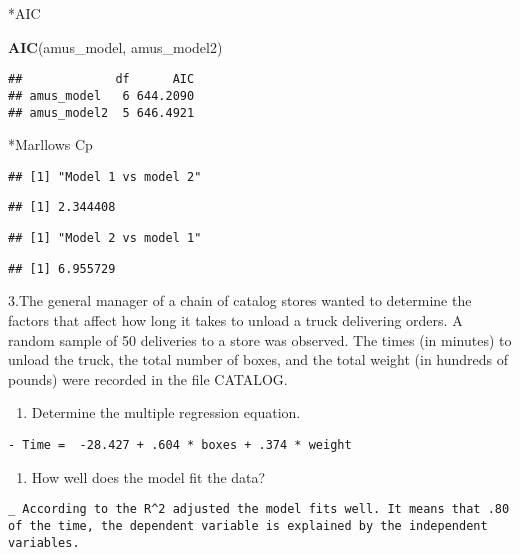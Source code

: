\documentclass[]{article}
\newenvironment{Shaded}{\begin{snugshade}}{\end{snugshade}}
\newcommand{\KeywordTok}[1]{\textcolor[rgb]{0.13,0.29,0.53}{\textbf{#1}}}
\newcommand{\NormalTok}[1]{#1}
\providecommand{\tightlist}{%
  \setlength{\itemsep}{0pt}\setlength{\parskip}{0pt}}
\begin{document}
*AIC

\begin{Shaded}
\begin{Highlighting}[]
\KeywordTok{AIC}\NormalTok{(amus_model, amus_model2)}
\end{Highlighting}
\end{Shaded}

\begin{verbatim}
##             df      AIC
## amus_model   6 644.2090
## amus_model2  5 646.4921
\end{verbatim}

*Marllows Cp

\begin{verbatim}
## [1] "Model 1 vs model 2"
\end{verbatim}

\begin{verbatim}
## [1] 2.344408
\end{verbatim}

\begin{verbatim}
## [1] "Model 2 vs model 1"
\end{verbatim}

\begin{verbatim}
## [1] 6.955729
\end{verbatim}

3.The general manager of a chain of catalog stores wanted to determine
the factors that affect how long it takes to unload a truck delivering
orders. A random sample of 50 deliveries to a store was observed. The
times (in minutes) to unload the truck, the total number of boxes, and
the total weight (in hundreds of pounds) were recorded in the file
CATALOG.

\begin{enumerate}
\def\labelenumi{\alph{enumi}.}
\tightlist
\item
  Determine the multiple regression equation.
\end{enumerate}

\begin{verbatim}
- Time =  -28.427 + .604 * boxes + .374 * weight
\end{verbatim}

\begin{enumerate}
\def\labelenumi{\alph{enumi}.}
\setcounter{enumi}{1}
\tightlist
\item
  How well does the model fit the data?
\end{enumerate}

\begin{verbatim}
_ According to the R^2 adjusted the model fits well. It means that .80 of the time, the dependent variable is explained by the independent variables. 
\end{verbatim}
\end{document}
